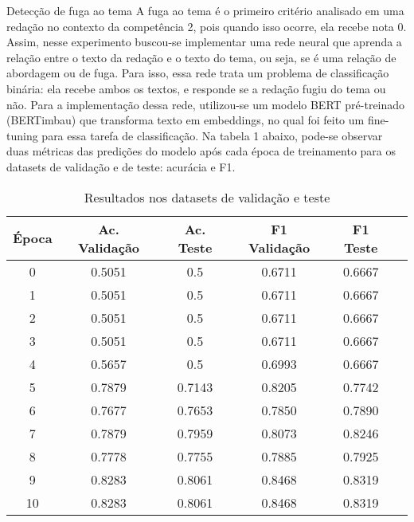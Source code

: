 \documentclass[
  xcolor={hyperref,svgnames,x11names,table},
  hyperref={pdfencoding=unicode,plainpages=false,pdfpagelabels=true,breaklinks=true},
  brazilian, english
]{beamer}
\begin{document}
\begin{frame}[fragile]
\begin{columns}[T]
  \begin{block}{Detecção de fuga ao tema}
    \justifying
        A fuga ao tema é o primeiro critério analisado em uma redação no contexto da competência 2, pois quando isso ocorre, ela recebe nota 0. Assim, nesse experimento buscou-se implementar uma rede neural que aprenda a relação entre o texto da redação e o texto do tema, ou seja, se é uma relação de abordagem ou de fuga. Para isso, essa rede trata um problema de classificação binária: ela recebe ambos os textos, e responde se a redação fugiu do tema ou não. Para a implementação dessa rede, utilizou-se um modelo BERT pré-treinado (BERTimbau) que transforma texto em embeddings, no qual foi feito um fine-tuning para essa tarefa de classificação. Na tabela 1 abaixo, pode-se observar duas métricas das predições do modelo após cada época de treinamento para os datasets de validação e de teste: acurácia e F1. \nocite{bertimbau} 

        \begin{table}[H]
          \centering
          \caption{Resultados nos datasets de validação e teste}
          \begin{tabular}{cccccc}
            \toprule
            \textbf{Época} & \textbf{Ac. Validação} & \textbf{Ac. Teste} & \textbf{F1 Validação} & \textbf{F1 Teste} \\
            \midrule
            0 & 0.5051 & 0.5 & 0.6711 & 0.6667 \\
            1 & 0.5051 & 0.5 & 0.6711 & 0.6667 \\
            2 & 0.5051 & 0.5 & 0.6711 & 0.6667 \\
            3 & 0.5051 & 0.5 & 0.6711 & 0.6667 \\
            4 & 0.5657 & 0.5 & 0.6993 & 0.6667 \\
            5 & 0.7879 & 0.7143 & 0.8205 & 0.7742 \\
            6 & 0.7677 & 0.7653 & 0.7850 & 0.7890 \\
            7 & 0.7879 & 0.7959 & 0.8073 & 0.8246 \\
            8 & 0.7778 & 0.7755 & 0.7885 & 0.7925 \\
            9 & 0.8283 & 0.8061 & 0.8468 & 0.8319 \\
            10 & 0.8283 & 0.8061 & 0.8468 & 0.8319 \\
            \bottomrule
            \end{tabular}
        \end{table}


\end{block}
\end{columns}
\end{frame}
\end{document}
